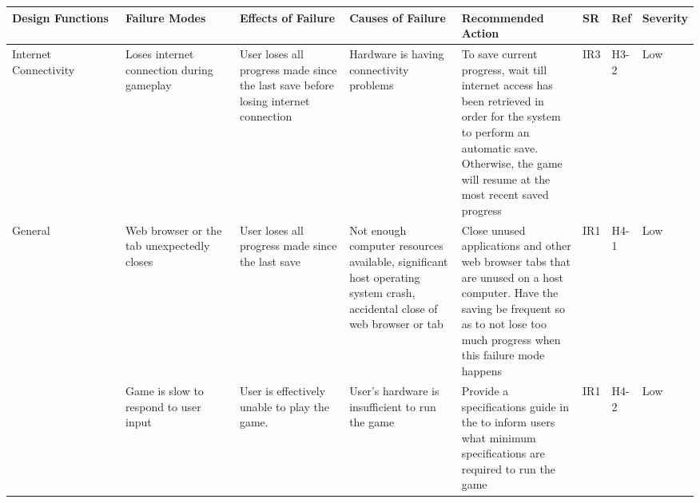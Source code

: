 \documentclass{article}
\begin{document}
\newpage 
\begin{table}[H]
    \begin{adjustbox}{width=\textwidth}
    \centering

    \begin{tabular}{|p{0.20\linewidth} | p{0.20\linewidth} | p{0.20\linewidth}|  p{0.20\linewidth}|  p{0.20\linewidth}|  p{0.05\linewidth}|  p{0.07\linewidth}|p{0.12\linewidth}| }
    \hline
         \textbf{Design Functions} & \textbf{Failure Modes} & \textbf{Effects of Failure} & \textbf{Causes of Failure} & \textbf{Recommended Action} & \textbf{SR} & \textbf{Ref}&\textbf{Severity} \\
         
        \hline
        
         Internet Connectivity 
         
         
          & Loses internet connection during gameplay  & User loses all progress made since the last save before losing internet connection & Hardware is having connectivity problems & To save current progress, wait till internet access has been retrieved in order for the system to perform an automatic save. Otherwise, the game will resume at the most recent saved progress  & IR3 & H3-2 & Low\\
         \hline
        General & Web browser or the tab unexpectedly closes & User loses all progress made since the last save & Not enough computer resources available, significant host operating system crash, accidental close of web browser or tab \newline & Close unused applications and other web browser tabs that are unused on a host computer. Have the saving be frequent so as to not lose too much progress when this failure mode happens
        & IR1 & H4-1 & Low\\
        
        & Game is slow to respond to user input & User is effectively unable to play the game. & User's hardware is insufficient to run the game & Provide a specifications guide in the to inform users what minimum specifications are required to run the game & IR1 & H4-2 & Low\\
        
         \hline
    \end{tabular}
    \end{adjustbox}
    \label{tab:my_label}
\end{table}
\end{document}
